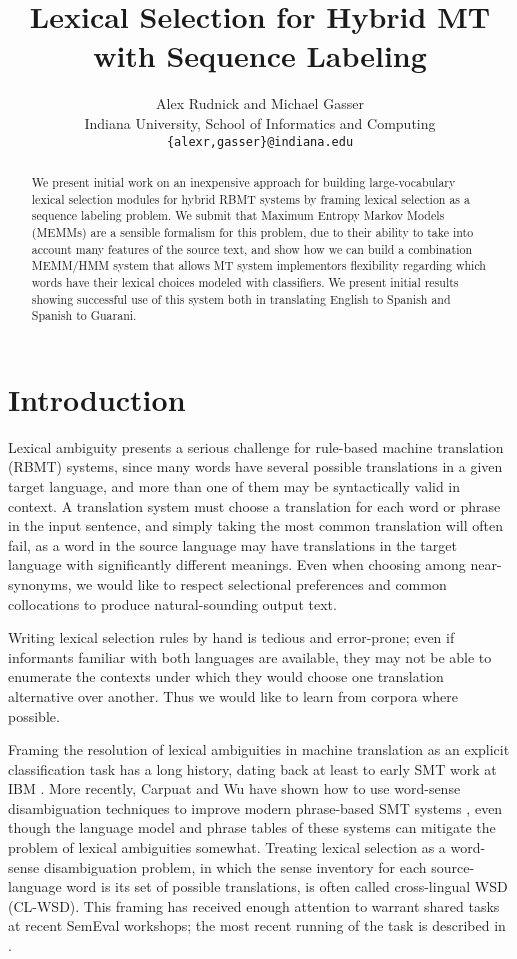\documentclass[11pt]{article}
\title{Lexical Selection for Hybrid MT with Sequence Labeling}
\author{Alex Rudnick and Michael Gasser\\
        Indiana University, School of Informatics and Computing \\
        {\tt \{alexr,gasser\}@indiana.edu}}
\date{}
\begin{document}
\maketitle
\begin{abstract}
We present initial work on an inexpensive approach for building
large-vocabulary lexical selection modules for hybrid RBMT systems by framing
lexical selection as a sequence labeling problem. We submit that Maximum
Entropy Markov Models (MEMMs) are a sensible formalism for this problem, due to
their ability to take into account many features of the source text, and show
how we can build a combination MEMM/HMM system that allows MT system
implementors flexibility regarding which words have their lexical choices
modeled with classifiers. We present initial results showing successful use of
this system both in translating English to Spanish and Spanish to Guarani.
\end{abstract}

\section{Introduction}
Lexical ambiguity presents a serious challenge for rule-based machine translation
(RBMT) systems, since
many words have several possible translations in a given target language, and
more than one of them may be syntactically valid in context. A translation
system must choose a translation for each word or phrase in the input sentence,
and simply taking the most common translation will often fail, as a word in the
source language may have translations in the target language with significantly
different meanings. Even when choosing among near-synonyms, we would like to
respect selectional preferences and common collocations to produce
natural-sounding output text.

Writing lexical selection rules by hand is tedious and error-prone; even if
informants familiar with both languages are available, they may not be able to
enumerate the contexts under which they would choose one translation
alternative over another. Thus we would like to learn from corpora where
possible. 

Framing the resolution of lexical ambiguities in machine translation
as an explicit classification
task has a long history, dating back at least to early SMT work at IBM
\cite{Brown91word-sensedisambiguation}.  More recently, Carpuat and Wu have
shown how to use word-sense disambiguation techniques to improve modern
phrase-based SMT systems \cite{carpuatpsd}, even though the language model and
phrase tables of these systems can mitigate the problem of lexical ambiguities
somewhat. Treating lexical selection as a word-sense disambiguation problem, in
which the sense inventory for each source-language word is its set of possible
translations, is often called cross-lingual WSD (CL-WSD). This framing has
received enough attention to warrant shared tasks at recent SemEval workshops;
the most recent running of the task is described in \cite{task10}.
\end{document}
